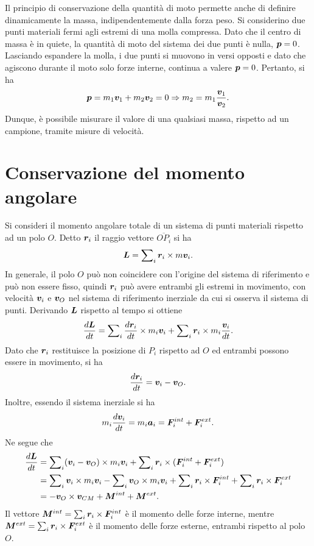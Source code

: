 Il principio di conservazione della quantità di moto permette anche di definire dinamicamente la massa, indipendentemente dalla forza peso. Si considerino due punti materiali fermi agli estremi di una molla compressa. Dato che il centro di massa è in quiete, la quantità di moto del sistema dei due punti è nulla, $\bm{p}=0$. Lasciando espandere la molla, i due punti si muovono in versi opposti e dato che agiscono durante il moto solo forze interne, continua a valere $\bm{p}=0$. Pertanto, si ha
\begin{equation}
    \bm{p}=m_1\bm{v}_1+m_2\bm{v}_2=0\Rightarrow m_2=m_1\frac{\bm{v}_1}{\bm{v}_2}.
\end{equation}
Dunque, è possibile misurare il valore di una qualsiasi massa, rispetto ad un campione, tramite misure di velocità. 

\section{Conservazione del momento angolare}
Si consideri il momento angolare totale di un sistema di punti materiali rispetto ad un polo $O$. Detto $\bm{r}_i$ il raggio vettore $\overline{OP_i}$ si ha
\begin{equation}
    \bm{L}=\sum\nolimits_i\bm{r}_i\times m\bm{v}_i.
\end{equation}
In generale, il polo $O$ può non coincidere con l'origine del sistema di riferimento e può non essere fisso, quindi $\bm{r}_i$ può avere entrambi gli estremi in movimento, con velocità $\bm{v}_i$ e $\bm{v}_O$ nel sistema di riferimento inerziale da cui si osserva il sistema di punti. Derivando $\bm{L}$ rispetto al tempo si ottiene
\begin{equation}
    \frac{d\bm{L}}{dt}=\sum\nolimits_i\frac{d\bm{r}_i}{dt}\times m_i\bm{v}_i+\sum\nolimits_i\bm{r}_i\times m_i\frac{\bm{v}_i}{dt}.
\end{equation}
Dato che $\bm{r}_i$ restituisce la posizione di $P_i$ rispetto ad $O$ ed entrambi possono essere in movimento, si ha
\begin{equation}
    \frac{d\bm{r}_i}{dt}=\bm{v}_i-\bm{v}_O.
\end{equation}
Inoltre, essendo il sistema inerziale si ha 
\begin{equation}
    m_i\frac{d\bm{v}_i}{dt}=m_i\bm{a}_i=\bm{F}_i^{int}+\bm{F}_i^{ext}.
\end{equation}
Ne segue che
\begin{equation}
    \begin{split}
        \frac{d\bm{L}}{dt}&=\sum\nolimits_i(\bm{v}_i-\bm{v}_O)\times m_i\bm{v}_i+\sum\nolimits_i\bm{r}_i\times(\bm{F}_i^{int}+\bm{F}_i^{ext}) \\
        &=\sum\nolimits_i\bm{v}_i\times m_i\bm{v}_i-\sum\nolimits_i\bm{v}_O\times m_i\bm{v}_i+\sum\nolimits_i\bm{r}_i\times\bm{F}_i^{int}+\sum\nolimits_i\bm{r}_i\times\bm{F}_i^{ext} \\
        &=-\bm{v}_O\times\bm{v}_{CM}+\bm{M}^{int}+\bm{M}^{ext}.
    \end{split}
\end{equation}
Il vettore $\bm{M}^{int}=\sum\nolimits_i\bm{r}_i\times\bm{F}_i^{int}$ è il momento delle forze interne, mentre $\bm{M}^{ext}=\sum\nolimits_i\bm{r}_i\times\bm{F}_i^{ext}$ è il momento delle forze esterne, entrambi rispetto al polo $O$. 

